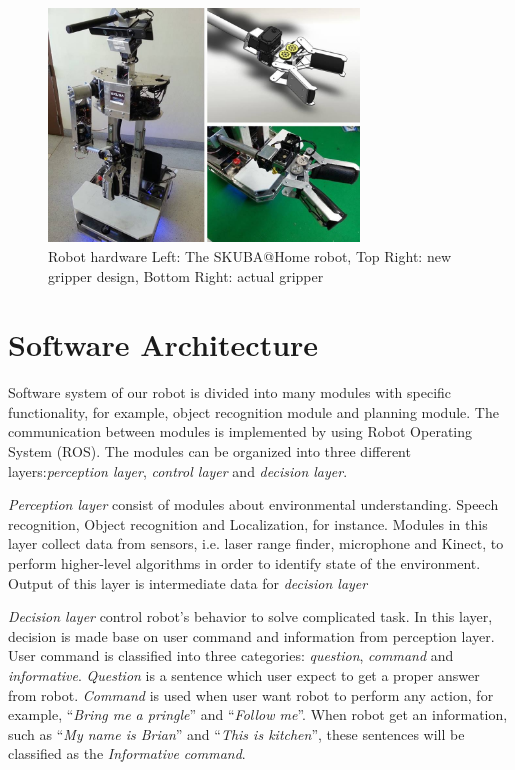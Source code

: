 \documentclass{llncs}
\newcommand{\dq}[1]{``#1''}
\begin{document}
\begin{figure}
\centering
\includegraphics[height=6.2cm]{robot_hardware}
\caption{Robot hardware Left: The SKUBA@Home robot, Top Right: new gripper design, Bottom Right: actual gripper}
\label{fig:base}
\end{figure}

\section{Software Architecture}
Software system of our robot is divided into many modules with specific functionality, for example, object recognition module and planning module. The communication between modules is implemented by using Robot Operating System (ROS). The modules can be organized into three different layers:\textit{perception layer}, \textit{control layer} and \textit{decision layer}.

\textit{Perception layer} consist of modules about environmental understanding. Speech recognition, Object recognition and Localization, for instance. Modules in this layer collect data from sensors, i.e. laser range finder, microphone and Kinect, to perform higher-level algorithms in order to identify state of the environment. Output of this layer is intermediate data for \textit{decision layer}

\textit{Decision layer} control robot's behavior to solve complicated task. In this layer, decision is made base on user command and information from perception layer. User command is classified into three categories: \textit{question}, \textit{command} and \textit{informative}. \textit{Question} is a sentence which user expect to get a proper answer from robot. \textit{Command} is used when user want robot to perform any action, for example, \dq{\textit{Bring me a pringle}} and \dq{\textit{Follow me}}. When robot get an information, such as \dq{\textit{My name is Brian}} and \dq{\textit{This is kitchen}}, these sentences will be classified as the \textit{Informative command}.
\end{document}

